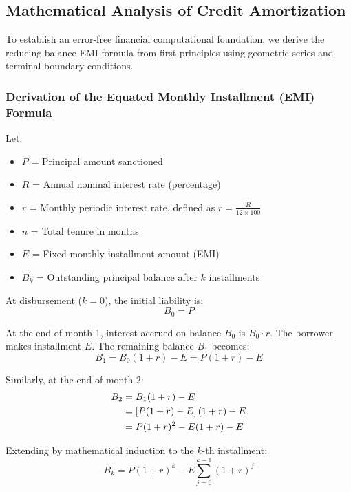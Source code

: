 \documentclass[11pt,a4paper]{report}
\begin{document}
\subsection{Mathematical Analysis of Credit Amortization}
To establish an error-free financial computational foundation, we derive the reducing-balance EMI formula from first principles using geometric series and terminal boundary conditions.

\subsubsection{Derivation of the Equated Monthly Installment (EMI) Formula}
Let:
\begin{itemize}
    \item $P$ = Principal amount sanctioned
    \item $R$ = Annual nominal interest rate (percentage)
    \item $r$ = Monthly periodic interest rate, defined as $r = \frac{R}{12 \times 100}$
    \item $n$ = Total tenure in months
    \item $E$ = Fixed monthly installment amount (EMI)
    \item $B_k$ = Outstanding principal balance after $k$ installments
\end{itemize}

At disbursement ($k = 0$), the initial liability is:
\begin{equation}
    B_0 = P
\end{equation}

At the end of month 1, interest accrued on balance $B_0$ is $B_0 \cdot r$. The borrower makes installment $E$. The remaining balance $B_1$ becomes:
\begin{equation}
    B_1 = B_0(1+r) - E = P(1+r) - E
\end{equation}

Similarly, at the end of month 2:
\begin{align}
    B_2 &= B_1(1+r) - E \notag \\
        &= \left[P(1+r) - E\right](1+r) - E \notag \\
        &= P(1+r)^2 - E(1+r) - E
\end{align}

Extending by mathematical induction to the $k$-th installment:
\begin{equation}
    B_k = P(1+r)^k - E \sum_{j=0}^{k-1} (1+r)^j
\end{equation}
\end{document}
